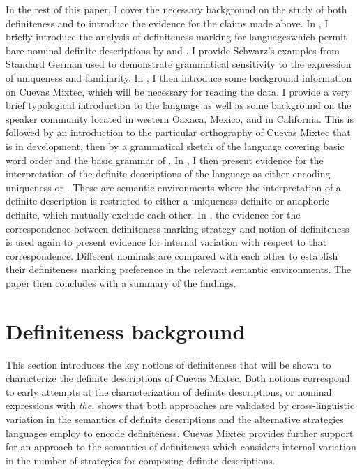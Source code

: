 \documentclass[output=paper,modfonts,nonflat]{langsci/langscibook}
\begin{document}
In the rest of this paper, I cover the necessary background on the study of both definiteness and  to introduce the evidence for the claims made above. In , I briefly introduce the analysis of definiteness marking for languages\linebreak which permit bare nominal definite descriptions by \citeauthor{Schwarz2009} and \citeauthor{Jenks2015}. I provide Schwarz's examples from Standard German used to demonstrate grammatical sensitivity to the expression of uniqueness and familiarity.  In , I then introduce some background information on Cuevas Mixtec, which will be necessary for reading the data.  I provide a very brief typological introduction to the language as well as some background on the speaker community located in western Oaxaca, Mexico, and in California.  This is followed by an introduction to the particular orthography of Cuevas Mixtec that is in development, then by a grammatical sketch of the language covering basic word order and the basic grammar of . In , I then present evidence for the interpretation of the definite descriptions of the language as either encoding uniqueness or .  These are semantic environments where the interpretation of a definite description is restricted to either a uniqueness definite or anaphoric definite, which mutually exclude each other.  In , the evidence for the correspondence between definiteness marking strategy and notion of definiteness is used again to present evidence for internal variation with respect to that correspondence.  Different nominals are compared with each other to establish their definiteness marking preference in the relevant semantic environments.  The paper then concludes with a summary of the findings.

\section{Definiteness background} \label{sec:cisneros:2}

This section introduces the key notions of definiteness that will be shown to characterize the definite descriptions of Cuevas Mixtec.  Both notions correspond to early attempts at the characterization of  definite descriptions, or nominal expressions with \textit{the}.  \citet{Schwarz2009} shows that both approaches are validated by cross-linguistic variation in the semantics of definite descriptions and the alternative strategies languages employ to encode definiteness.  Cuevas Mixtec provides further support for an approach to the semantics of definiteness which considers internal variation in the number of strategies for composing definite descriptions. 
\end{document}
